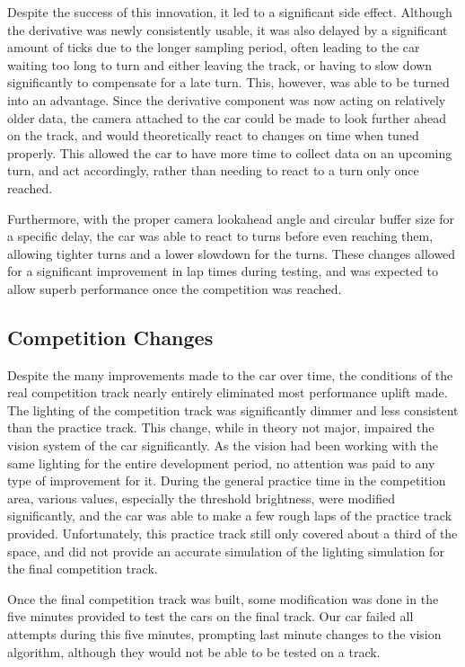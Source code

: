 \documentclass[conference]{IEEEtran}
\begin{document}
    Despite the success of this innovation, it led to a significant side effect.
    Although the derivative was newly consistently usable, it was also delayed by a significant amount of ticks due to the longer sampling period, often
    leading to the car waiting too long to turn and either leaving the track, or having to slow down significantly to compensate for a late turn.
    This, however, was able to be turned into an advantage. Since the derivative component was now acting on relatively older data, the camera attached
    to the car could be made to look further ahead on the track, and would theoretically react to changes on time when tuned properly.
    This allowed the car to have more time to collect data on an upcoming turn, and act accordingly, rather than needing to react to a turn only
    once reached.

    Furthermore, with the proper camera lookahead angle and circular buffer size for a specific delay, the car was able to react to turns before even
    reaching them, allowing tighter turns and a lower slowdown for the turns. These changes allowed for a significant improvement in lap times during
    testing, and was expected to allow superb performance once the competition was reached.

\subsection{Competition Changes}
    Despite the many improvements made to the car over time, the conditions of the real competition track nearly entirely eliminated most performance
    uplift made. The lighting of the competition track was significantly dimmer and less consistent than the practice track.
    This change, while in theory not major, impaired the vision system of the car significantly.
    As the vision had been working with the same lighting for the entire development period, no attention was paid to any type of improvement for it.
    During the general practice time in the competition area, various values, especially the threshold brightness, were modified significantly, and
    the car was able to make a few rough laps of the practice track provided.
    Unfortunately, this practice track still only covered about a third of the space, and did not provide an accurate simulation of the lighting
    simulation for the final competition track.
    
    Once the final competition track was built, some modification was done in the five minutes provided to test the cars on the final track.
    Our car failed all attempts during this five minutes, prompting last minute changes to the vision algorithm, although they would not be
    able to be tested on a track.
\end{document}
